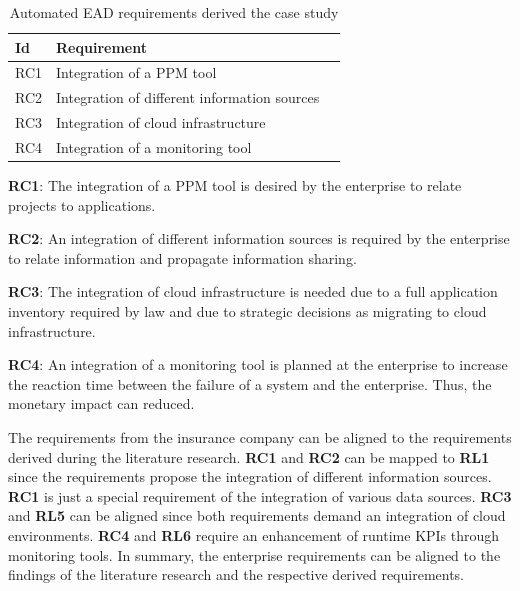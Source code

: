\begin{table}[htpb]
  \caption[Automated EAD requirements derived from the case study]{Automated EAD requirements derived the case study}\label{tab:casestudyrequirements}
  \centering
  \begin{tabular}{l l l}
    \toprule
      Id & Requirement\\
    \midrule
      RC1 & Integration of a PPM tool\\
      RC2 & Integration of different information sources\\
      RC3 & Integration of cloud infrastructure\\
      RC4 & Integration of a monitoring tool\\
    \bottomrule
  \end{tabular}
\end{table}



\textbf{RC1}: The integration of a PPM tool is desired by the enterprise to relate projects to applications.

\textbf{RC2}: An integration of different information sources is required by the enterprise to relate information and propagate information sharing.

\textbf{RC3}: The integration of cloud infrastructure is needed due to a full application inventory required by law and due to strategic decisions as migrating to cloud infrastructure.

\textbf{RC4}: An integration of a monitoring tool is planned at the enterprise to increase the reaction time between the failure of a system and the enterprise. Thus, the monetary impact can reduced.

The requirements from the insurance company  can be aligned to the requirements derived during the literature research. \textbf{RC1} and \textbf{RC2} can be mapped to \textbf{RL1} since the requirements propose the integration of different information sources. \textbf{RC1} is just a special requirement of the integration of various data sources. \textbf{RC3} and \textbf{RL5} can be aligned since both requirements demand an integration of cloud environments. \textbf{RC4} and \textbf{RL6} require an enhancement of runtime KPIs through monitoring tools.
In summary, the enterprise requirements can be aligned to the findings of the literature research and the respective derived requirements. 

